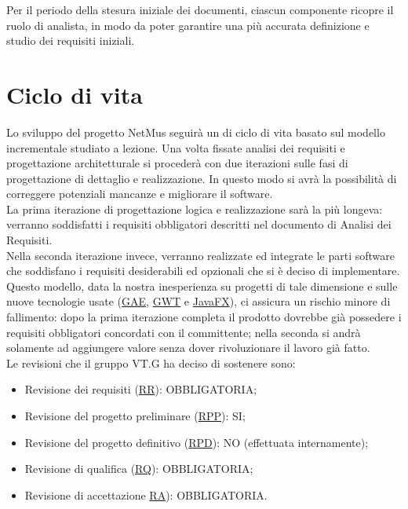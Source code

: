 Per il periodo della stesura iniziale dei documenti, ciascun
componente ricopre il ruolo di analista, in modo da poter garantire una pi\`u
accurata definizione e studio dei requisiti iniziali.

\chapter{Ciclo di vita}
\thispagestyle{fancy}
Lo sviluppo del progetto NetMus seguir\`a un di ciclo di vita basato sul
modello incrementale studiato a lezione. Una volta fissate analisi dei requisiti
e progettazione architetturale si proceder\`a con due iterazioni sulle fasi di
progettazione di dettaglio e realizzazione. In questo modo si avr\`a la
possibilit\`a di correggere potenziali mancanze e migliorare il
software.\\
La prima iterazione di progettazione logica e realizzazione sar\`a la pi\`u
longeva: verranno soddisfatti i requisiti obbligatori descritti nel documento di
Analisi dei Requisiti.\\
Nella seconda iterazione invece, verranno realizzate ed integrate le parti
software che soddisfano i requisiti desiderabili ed opzionali che si \`e deciso
di implementare.\\

Questo modello, data la nostra inesperienza su progetti di tale dimensione e
sulle nuove tecnologie usate (\underline{GAE}, \underline{GWT} e
\underline{JavaFX}), ci assicura un rischio minore di fallimento: dopo la prima iterazione completa il prodotto dovrebbe
gi\`a possedere i requisiti obbligatori concordati con il committente; nella
seconda si andr\`a solamente ad aggiungere valore senza dover rivoluzionare il
lavoro gi\`a fatto.\\

Le revisioni che il gruppo VT.G ha deciso di sostenere sono:
\begin{itemize}
  \item Revisione dei requisiti (\underline{RR}): OBBLIGATORIA;
  \item Revisione del progetto preliminare (\underline{RPP}): SI;
  \item Revisione del progetto definitivo (\underline{RPD}): NO (effettuata
  internamente);
  \item Revisione di qualifica (\underline{RQ}): OBBLIGATORIA;
  \item Revisione di accettazione \underline{RA}): OBBLIGATORIA.
\end{itemize} \vspace{0.5cm}

